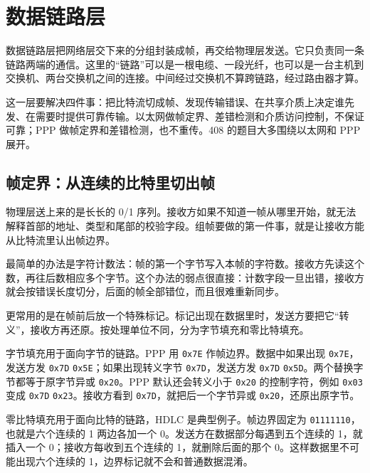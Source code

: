 \section{数据链路层}

数据链路层把网络层交下来的分组封装成帧，再交给物理层发送。它只负责同一条链路两端的通信。这里的“链路”可以是一根电缆、一段光纤，也可以是一台主机到交换机、两台交换机之间的连接。中间经过交换机不算跨链路，经过路由器才算。

这一层要解决四件事：把比特流切成帧、发现传输错误、在共享介质上决定谁先发、在需要时提供可靠传输。以太网做帧定界、差错检测和介质访问控制，不保证可靠；PPP 做帧定界和差错检测，也不重传。408 的题目大多围绕以太网和 PPP 展开。

\subsection{帧定界：从连续的比特里切出帧}

物理层送上来的是长长的 0/1 序列。接收方如果不知道一帧从哪里开始，就无法解释首部的地址、类型和尾部的校验字段。组帧要做的第一件事，就是让接收方能从比特流里认出帧边界。

最简单的办法是字符计数法：帧的第一个字节写入本帧的字符数。接收方先读这个数，再往后数相应多个字节。这个办法的弱点很直接：计数字段一旦出错，接收方就会按错误长度切分，后面的帧全部错位，而且很难重新同步。

更常用的是在帧前后放一个特殊标记。标记出现在数据里时，发送方要把它“转义”，接收方再还原。按处理单位不同，分为字节填充和零比特填充。

字节填充用于面向字节的链路。PPP 用 \texttt{0x7E} 作帧边界。数据中如果出现 \texttt{0x7E}，发送方发 \texttt{0x7D} \texttt{0x5E}；如果出现转义字节 \texttt{0x7D}，发送方发 \texttt{0x7D} \texttt{0x5D}。两个替换字节都等于原字节异或 \texttt{0x20}。PPP 默认还会转义小于 \texttt{0x20} 的控制字符，例如 \texttt{0x03} 变成 \texttt{0x7D} \texttt{0x23}。接收方看到 \texttt{0x7D}，就把后一个字节异或 \texttt{0x20}，还原出原字节。

零比特填充用于面向比特的链路，HDLC 是典型例子。帧边界固定为 \texttt{01111110}，也就是六个连续的 1 两边各加一个 0。发送方在数据部分每遇到五个连续的 1，就插入一个 0；接收方每收到五个连续的 1，就删除后面的那个 0。这样数据里不可能出现六个连续的 1，边界标记就不会和普通数据混淆。

